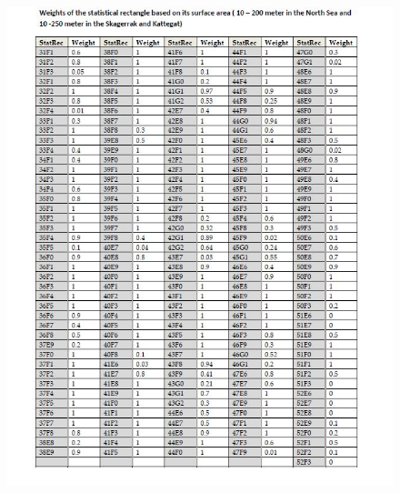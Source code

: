 \documentclass[a4paper 12pt]{article}
\numberwithin{equation}{section}
\begin{document}
\begin{figure}[h!]
  \centering
 {\includegraphics[width=17.5cm]{recWeightings.jpg}}   
 \captionsetup{font= footnotesize, width=15cm}{
 \caption{}\label{weightings11}}
\end{figure}

\clearpage


\clearpage
\end{document}

